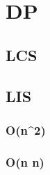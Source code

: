 %         

%         

\section{DP}
    \subsection{LCS}
        
    \subsection{LIS}
        \subsubsection{O(n^2)}
             
        \subsubsection{O(n \log n)}
            
